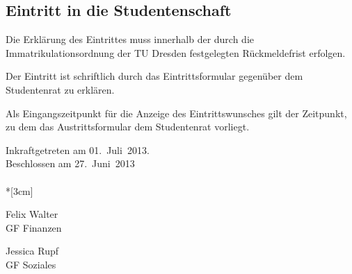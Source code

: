 \begin{multicols}{2}
\section{Eintritt in die Studentenschaft}

\Abs \Satz  Die Erklärung des Eintrittes muss innerhalb der durch die Immatrikulationsordnung der TU Dresden festgelegten Rückmeldefrist erfolgen.

\Abs \Satz Der Eintritt ist schriftlich durch das Eintrittsformular gegenüber dem Studentenrat zu erklären.

\Abs \Satz Als Eingangszeitpunkt für die Anzeige des Eintrittswunsches gilt der Zeitpunkt, zu dem das Austrittsformular dem Studentenrat vorliegt.
\end{multicols}

\nopagebreak
\vspace{1cm}
Inkraftgetreten am 01.~Juli~2013.\\

\footnotesize
Beschlossen am 27.~Juni~2013\\


\normalsize
~\\*[3cm]
\begin{center}
\hspace*{\fill}
\parbox{5cm}{Felix Walter\\GF Finanzen}
\hfill\parbox{7cm}{Jessica Rupf\\GF Soziales}
\hspace*{\fill}
\end{center}
